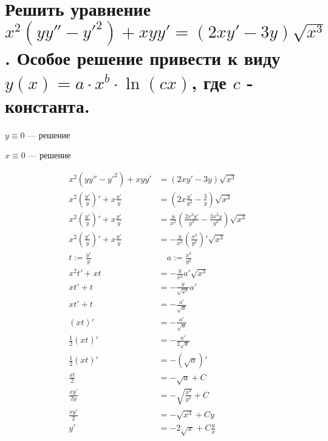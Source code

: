 \section{Решить уравнение $x^2(yy''-y'^2)+xyy'=(2xy'-3y)\sqrt{x^3}$. Особое решение привести к виду $y(x)=a\cdot x^b\cdot \ln(cx)$, где $c$ - константа.}

$y\equiv0$ --- решение

$x\equiv0$ --- решение

\begin{align*}
    x^2(yy''-y'^2)+xyy'                         & = (2xy'-3y)\sqrt{x^3}                                                      \\
    x^2\left(\frac{y'}{y}\right)'+x\frac{y'}{y} & = \left(2x\frac{y'}{y^2}-\frac{3}{y}\right)\sqrt{x^3}                      \\
    x^2\left(\frac{y'}{y}\right)'+x\frac{y'}{y} & = \frac{y}{x^2}\left(\frac{2x^3y'}{y^3}-\frac{3x^2y}{y^3}\right)\sqrt{x^3} \\
    x^2\left(\frac{y'}{y}\right)'+x\frac{y'}{y} & = -\frac{y}{x^2}\left(\frac{x^3}{y^2}\right)'\sqrt{x^3}                    \\
    t := \frac{y'}{y}                           & \quad a := \frac{x^3}{y^2}                                                 \\
    x^2 t'+xt                                   & = -\frac{y}{x^2}a'\sqrt{x^3}                                               \\
    x t'+t                                      & = -\frac{y}{\sqrt{x^3}}a'                                                  \\
    x t'+t                                      & = -\frac{a'}{\sqrt a}                                                      \\
    (xt)'                                       & = -\frac{a'}{\sqrt a}                                                      \\
    \frac{1}{2}(xt)'                            & = -\frac{a'}{2\sqrt a}                                                     \\
    \frac{1}{2}(xt)'                            & = -\left(\sqrt{a}\right)'                                                  \\
    \frac{xt}{2}                                & = -\sqrt a + C                                                             \\
    \frac{xy'}{2y}                              & = -\sqrt{\frac{x^3}{y^2}} + C                                              \\
    \frac{xy'}{2}                               & = -\sqrt{x^3} + Cy                                                         \\
    y'                                          & = -2\sqrt{x} + C\frac{y}{x}                                                \\
\end{align*}

